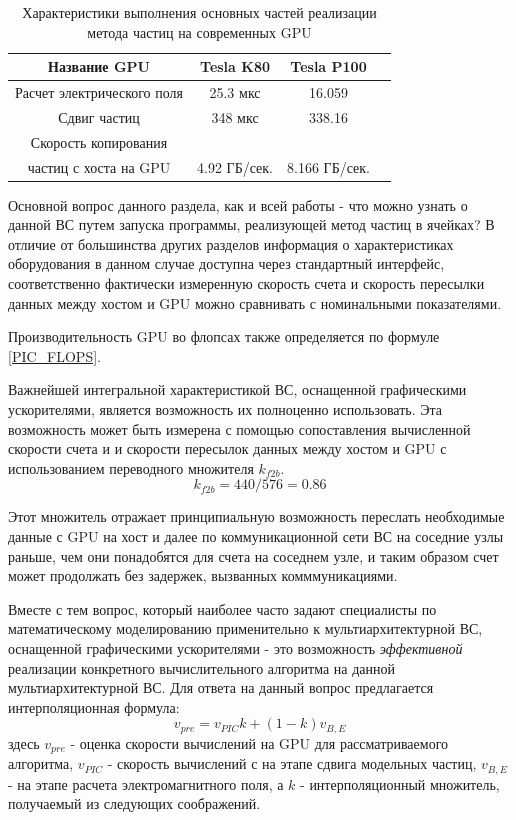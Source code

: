 \begin{table}[ht]
	\begin{center}
		\caption{Характеристики выполнения основных частей реализации метода частиц на современных GPU}
		\begin{tabular}{|c|c|c|c|}
			\hline
			Название GPU                &  Tesla K80   & Tesla P100 \\ \hline
			Расчет электрического поля  &  25.3 мкс    &  16.059    \\ \hline
			Сдвиг частиц                &  348 мкс     &  338.16    \\ \hline
			Скорость копирования        &              &            \\
			частиц с хоста на GPU       & 4.92 ГБ/сек. &8.166 ГБ/сек.  \\ \hline
		\end{tabular}
		\label{PerfGPU}
	\end{center}
\end{table}

Основной вопрос данного раздела, как и всей работы - что можно узнать о данной ВС путем запуска программы, реализующей метод частиц в ячейках? В отличие от 	большинства других разделов информация о характеристиках оборудования в данном случае доступна через стандартный интерфейс, соответственно фактически измеренную скорость счета и скорость пересылки данных между хостом и GPU можно сравнивать с номинальными показателями.

Производительность GPU во флопсах также определяется по формуле \ref{PIC_FLOPS}.

Важнейшей интегральной характеристикой ВС, оснащенной графическими ускорителями, является возможность их полноценно использовать. Эта возможность
может быть измерена с помощью сопоставления вычисленной скорости счета и и скорости пересылок данных между хостом и GPU с использованием переводного множителя $k_{f2b}$. 
\begin{equation}
\label{kf2b}
k_{f2b} = 440/576 = 0.86
\end{equation}

Этот множитель отражает принципиальную возможность переслать необходимые данные с GPU на хост и далее по коммуникационной сети ВС на соседние узлы раньше, чем они понадобятся для счета на соседнем узле, и таким образом счет может продолжать без задержек, вызванных комммуникациями.

Вместе с тем вопрос, который наиболее часто задают специалисты по математическому моделированию применительно к мультиархитектурной ВС, оснащенной графическими ускорителями - это возможность \textit{эффективной} реализации конкретного вычислительного алгоритма на данной мультиархитектурной ВС.
Для ответа на данный вопрос предлагается интерполяционная формула:
\begin{equation}
v_{pre} = v_{PIC} k + (1-k) v_{B,E}
\end{equation} 
здесь $ v_{pre}$ - оценка скорости вычислений на GPU для рассматриваемого алгоритма, $v_{PIC}$ - скорость вычислений с на этапе сдвига модельных частиц, $v_{B,E}$ - на этапе расчета электромагнитного поля, а $k$ - интерполяционный множитель, получаемый из следующих соображений.

